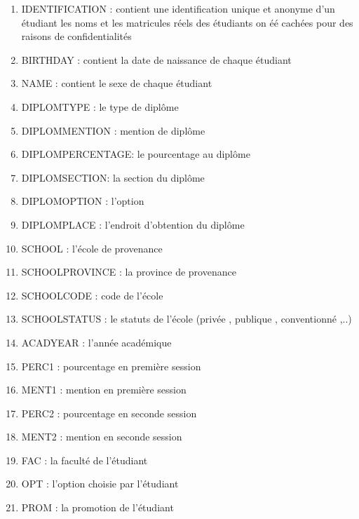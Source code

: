 \begin{multicols}{2}
	\begin{enumerate}
	 \item IDENTIFICATION : contient une identification unique et anonyme d'un étudiant les noms et les matricules réels des étudiants on éé cachées
	pour des raisons de confidentialités
	
	\item BIRTHDAY : contient la date de naissance de chaque étudiant
	
	\item NAME : contient le sexe de chaque étudiant
	
	\item DIPLOMTYPE : le type de diplôme
	
	\item DIPLOMMENTION : mention de diplôme
	
	\item  DIPLOMPERCENTAGE: le pourcentage au diplôme
	
	\item DIPLOMSECTION: la section du diplôme
	
	\item DIPLOMOPTION : l'option
	
	\item  DIPLOMPLACE : l'endroit d'obtention du diplôme
	
	\item SCHOOL : l'école de provenance
	
	\item  SCHOOLPROVINCE : la province de provenance
	
	\item  SCHOOLCODE : code de l'école
	
	\item SCHOOLSTATUS : le statuts de l'école (privée , publique ,
	conventionné ,..)
	
	\item  ACADYEAR : l'année académique
	
	\item  PERC1 : pourcentage en première session
	
	\item  MENT1 : mention en première session
	
	\item  PERC2 : pourcentage en seconde session
	
	\item  MENT2 : mention en seconde session
	
	\item  FAC : la faculté de l'étudiant 
	
	\item  OPT : l'option choisie par l'étudiant
	
	\item  PROM : la promotion de l'étudiant 
	\end{enumerate}
\end{multicols}

